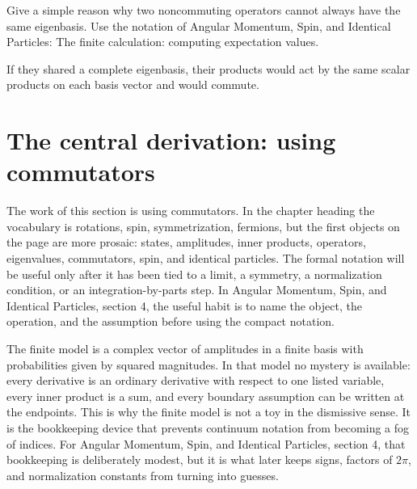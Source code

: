 \begin{exercise}
Give a simple reason why two noncommuting operators cannot always have the same eigenbasis.  Use the notation of Angular Momentum, Spin, and Identical Particles: The finite calculation: computing expectation values.
\begin{answer}
If they shared a complete eigenbasis, their products would act by the same scalar products on each basis vector and would commute.
\end{answer}
\end{exercise}



\section{The central derivation: using commutators}













The work of this section is using commutators.  In the chapter heading the vocabulary is rotations, spin, symmetrization, fermions, but the first objects on the page are more prosaic: states, amplitudes, inner products, operators, eigenvalues, commutators, spin, and identical particles.  The formal notation will be useful only after it has been tied to a limit, a symmetry, a normalization condition, or an integration-by-parts step.  In Angular Momentum, Spin, and Identical Particles, section 4, the useful habit is to name the object, the operation, and the assumption before using the compact notation.

The finite model is a complex vector of amplitudes in a finite basis with probabilities given by squared magnitudes.  In that model no mystery is available: every derivative is an ordinary derivative with respect to one listed variable, every inner product is a sum, and every boundary assumption can be written at the endpoints.  This is why the finite model is not a toy in the dismissive sense.  It is the bookkeeping device that prevents continuum notation from becoming a fog of indices.  For Angular Momentum, Spin, and Identical Particles, section 4, that bookkeeping is deliberately modest, but it is what later keeps signs, factors of \(2\pi\), and normalization constants from turning into guesses.

